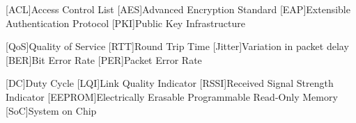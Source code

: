 \begin{acronym}
    
        [ACL]{Access Control List}
        [AES]{Advanced Encryption Standard}
        [EAP]{Extensible Authentication Protocol}
        [PKI]{Public Key Infrastructure}
    
        [QoS]{Quality of Service}
        [RTT]{Round Trip Time}
        [Jitter]{Variation in packet delay}
        [BER]{Bit Error Rate}
        [PER]{Packet Error Rate}
    
        [DC]{Duty Cycle}
        [LQI]{Link Quality Indicator}
        [RSSI]{Received Signal Strength Indicator}
        [EEPROM]{Electrically Erasable Programmable Read-Only Memory}
        [SoC]{System on Chip}
\end{acronym}